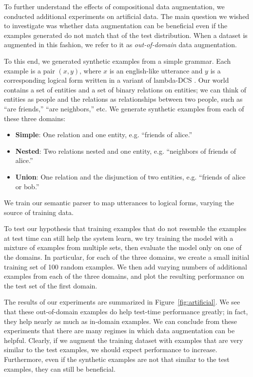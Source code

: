 \documentclass[11pt,letterpaper]{article}
\begin{document}
To further understand the effects of compositional data augmentation,
we conducted additional experiments on artificial data.
The main question we wished to investigate was whether
data augmentation can be beneficial even if the examples generated
do not match that of the test distribution.
When a dataset is augmented in this fashion, we refer to it
as \emph{out-of-domain} data augmentation.

To this end, we generated synthetic examples from a simple grammar.
Each example is a pair $(x, y)$, where
$x$ is an english-like utterance and $y$ is a corresponding
logical form written in a variant of lambda-DCS \cite{liang2013lambdadcs}.
Our world contains a set of entities and a set of binary relations
on entities; we can think of entities as people
and the relations as relationships between two people, such as ``are friends,''
``are neighbors,'' etc.  
We generate synthetic examples from each of these three domains:
\begin{itemize}
  \item \textbf{Simple}: One relation and one entity, 
    e.g. ``friends of alice.''
  \item \textbf{Nested}: Two relations nested and one entity, 
    e.g. ``neighbors of friends of alice.''
  \item \textbf{Union}: One relation and the disjunction of two entities,
    e.g. ``friends of alice or bob.''
\end{itemize} 
We train our semantic parser to map utterances to logical forms,
varying the source of training data.

To test our hypothesis that training examples that do not resemble
the examples at test time can still help the system learn,
we try training the model with a mixture of examples from
multiple sets, then evaluate the model only on one of the domains.
In particular, for each of the three domains,
we create a small initial training set of 100 random examples.
We then add varying numbers of additional examples from
each of the three domains, and plot the resulting 
performance on the test set of the first domain.

The results of our experiments are summarized in Figure~\ref{fig:artificial}.
We see that these out-of-domain examples do help test-time performance greatly;
in fact, they help nearly as much as in-domain examples.
We can conclude from these experiments that there are many regimes
in which data augmentation can be helpful.
Clearly, if we augment the training dataset with examples that
are very similar to the test examples, we should expect performance to increase.
Furthermore, even if the synthetic examples are not that similar
to the test examples, they can still be beneficial.
\end{document}
